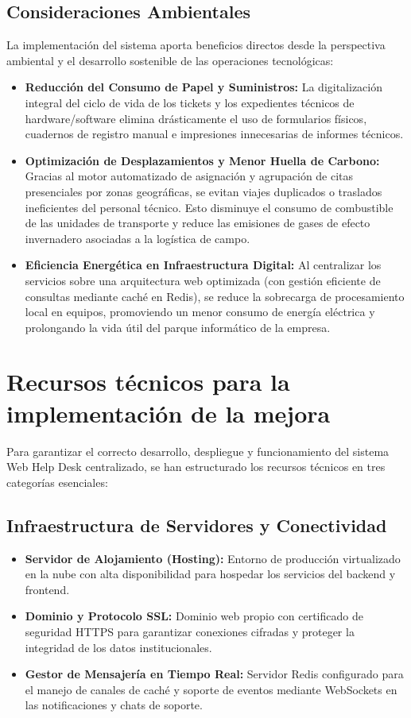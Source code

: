 \subsection{Consideraciones Ambientales}
La implementación del sistema aporta beneficios directos desde la perspectiva ambiental y el desarrollo sostenible de las operaciones tecnológicas:
\begin{itemize}
\item \textbf{Reducción del Consumo de Papel y Suministros:} La digitalización integral del ciclo de vida de los tickets y los expedientes técnicos de hardware/software elimina drásticamente el uso de formularios físicos, cuadernos de registro manual e impresiones innecesarias de informes técnicos.
\item \textbf{Optimización de Desplazamientos y Menor Huella de Carbono:} Gracias al motor automatizado de asignación y agrupación de citas presenciales por zonas geográficas, se evitan viajes duplicados o traslados ineficientes del personal técnico. Esto disminuye el consumo de combustible de las unidades de transporte y reduce las emisiones de gases de efecto invernadero asociadas a la logística de campo.
\item \textbf{Eficiencia Energética en Infraestructura Digital:} Al centralizar los servicios sobre una arquitectura web optimizada (con gestión eficiente de consultas mediante caché en Redis), se reduce la sobrecarga de procesamiento local en equipos, promoviendo un menor consumo de energía eléctrica y prolongando la vida útil del parque informático de la empresa.
\end{itemize}

\section{Recursos técnicos para la implementación de la mejora}

Para garantizar el correcto desarrollo, despliegue y funcionamiento del sistema Web Help Desk centralizado, se han estructurado los recursos técnicos en tres categorías esenciales:

\subsection{Infraestructura de Servidores y Conectividad}
\begin{itemize}
\item \textbf{Servidor de Alojamiento (Hosting):} Entorno de producción virtualizado en la nube con alta disponibilidad para hospedar los servicios del backend y frontend.
\item \textbf{Dominio y Protocolo SSL:} Dominio web propio con certificado de seguridad HTTPS para garantizar conexiones cifradas y proteger la integridad de los datos institucionales.
\item \textbf{Gestor de Mensajería en Tiempo Real:} Servidor Redis configurado para el manejo de canales de caché y soporte de eventos mediante WebSockets en las notificaciones y chats de soporte.
\end{itemize}


